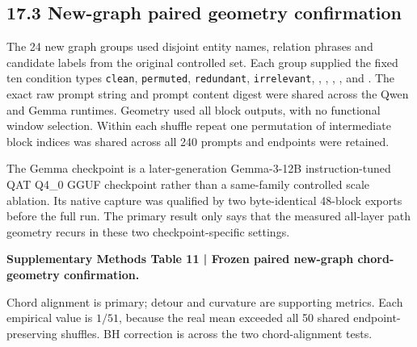 \documentclass[10pt]{article}
\begin{document}
\subsection*{17.3 New-graph paired geometry confirmation}

The 24 new graph groups used disjoint entity names, relation phrases and candidate labels from the original controlled set. Each group supplied the fixed ten condition types \texttt{clean}, \texttt{permuted}, \texttt{redundant}, \texttt{irrelevant}, \texttt{}, \texttt{}, \texttt{}, \texttt{}, \texttt{} and \texttt{}. The exact raw prompt string and prompt content digest were shared across the Qwen and Gemma runtimes. Geometry used all block outputs, with no functional window selection. Within each shuffle repeat one permutation of intermediate block indices was shared across all 240 prompts and endpoints were retained.

The Gemma checkpoint is a later-generation Gemma-3-12B instruction-tuned QAT Q4\_0 GGUF checkpoint rather than a same-family controlled scale ablation. Its native capture was qualified by two byte-identical 48-block exports before the full run. The primary result only says that the measured all-layer path geometry recurs in these two checkpoint-specific settings.

\textbf{Supplementary Methods Table 11 | Frozen paired new-graph chord-geometry confirmation.}

Chord alignment is primary; detour and curvature are supporting metrics. Each empirical value is \(1/51\), because the real mean exceeded all 50 shared endpoint-preserving shuffles. BH correction is across the two chord-alignment tests.
\end{document}
